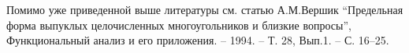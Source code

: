 \begin{remark}
Помимо уже приведенной выше литературы см. статью А.М.Вершик ``Предельная форма выпуклых целочисленных многоугольников и близкие вопросы'', Функциональный анализ и его приложения. -- 1994. -- Т. 28, Вып.1. -- С. 16–25.
\end{remark}
\begin{comment}

\begin{problem}
\label{sub_exp}
Характеристические функции с.в. $\xi_k$ ограничены согласно выражениям
\[
\log \Exp e^{\lambda \xi_k} \leq \frac{q_k^2 + \lambda^2}{2}, 
\quad |\lambda| < g.
\]
Покажите, что для суммы $S = \sum_k c_k \xi_k$ при условиях $\sum_k c_k = 1$, $\sum_k e^{-q_k} \leq 1$  выполнены следующие утверждения:

\begin{enumerate}
\item если $g = \infty$, то
\[
\log \Exp e^{S} \leq H_1 = \sum_k c_k q_k,
\]
\[
\forall x \geq \frac{1}{2}:  \; \PR(S \geq H_1 + \sqrt{2x}) \leq e^{-x}.
\]

\item если $g < \infty$, то $\forall |\lambda| < g$
\[
\log \Exp e^{\lambda S} \leq \frac{H_2 + \lambda^2}{2}, 
\quad H_2 = \sum_k c_k q_k^2,
\]
\[
\forall x \geq \frac{1}{2}:  \; \PR(S \geq H(x)) \leq e^{-x}, 
\quad H(x) = H_1 + \sqrt{2x} + \frac{g^{-2} x + 1}{g} H_2.  
\]
\item если $g^2 \geq H_2 + 1$, то
\[
\Exp S \leq H_1 + \frac{H_2}{g} + 3,
\quad
\Exp S^2 \leq \left(H_1 + \frac{H_2}{g} + 4 \right)^2.
\]

\end{enumerate}

\end{problem}

\begin{ordre}
\begin{enumerate}
\item Воспользуйтесь неравенством Гельдера в виде 
\[
\log \Exp e^{\sum_k a_k \zeta_k} \leq \sum_k a_k \log \Exp e^{\zeta_k},
\]  
а также соотношением
\[
\PR \left(\sum_k \zeta_k \geq 0 \right) \leq \sum_k \PR (\zeta_k \geq 0).
\]
\item Введем вспомогательную переменную
\[
z_k(\lambda_k) = 
\begin{cases}
\frac{x+q_k}{g} + \frac{g}{2} + \frac{q^2_k}{2g}, \quad \lambda_k \geq g, \\
q_k + \sqrt{2x}, \quad \lambda_k < g.
\end{cases}
\]
Убедитесь, что 
\[
\PR(\xi_k \geq z_k) \leq e^{-x}, 
\quad
\sum_k c_k z_k \leq H(x).
\]
\item Примените результат задачи \ref{mom_ineq} из раздела \ref{standart}.
\end{enumerate}
\end{ordre}

\end{comment}





